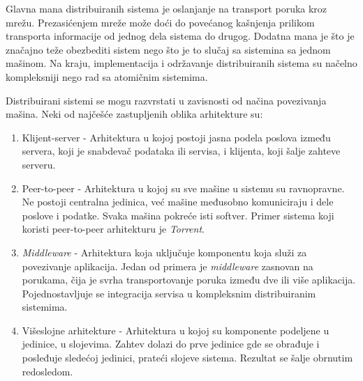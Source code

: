 \documentclass[12pt,oneside]{memoir}
\begin{document}
Glavna mana distribuiranih sistema je oslanjanje na transport poruka kroz mrežu. Prezasićenjem mreže može doći do povećanog kašnjenja prilikom transporta informacije od jednog dela sistema do drugog. Dodatna mana je što je značajno teže obezbediti sistem nego što je to slučaj sa sistemina sa jednom mašinom. Na kraju, implementacija i održavanje distribuiranih sistema su načelno kompleksniji nego rad sa atomičnim sistemima.

Distribuirani sistemi se mogu razvrstati u zavisnosti od načina povezivanja mašina. Neki od najčešće zastupljenih oblika arhitekture su:
\begin{enumerate}
\item Klijent-server - Arhitektura u kojoj postoji jasna podela poslova između servera, koji je snabdevač podataka ili servisa, i klijenta, koji šalje zahteve serveru.
\item Peer-to-peer - Arhitektura u kojoj su sve mašine u sistemu su ravnopravne. Ne postoji centralna jedinica, već mašine međusobno komuniciraju i dele poslove i podatke. Svaka mašina pokreće isti softver. Primer sistema koji koristi peer-to-peer arhitekturu je \emph{Torrent}.
\item \emph{Middleware} - Arhitektura koja uključuje komponentu koja služi za povezivanje aplikacija. Jedan od primera je \emph{middleware} zasnovan na porukama, čija je svrha transportovanje poruka između dve ili više aplikacija. Pojednostavljuje se integracija servisa u kompleksnim distribuiranim sistemima.
\item Višeslojne arhitekture - Arhitektura u kojoj su komponente podeljene u jedinice, u slojevima. Zahtev dolazi do prve jedinice gde se obrađuje i posleđuje sledećoj jedinici, prateći slojeve sistema. Rezultat se šalje obrnutim redosledom.
\end{enumerate}
\end{document}

